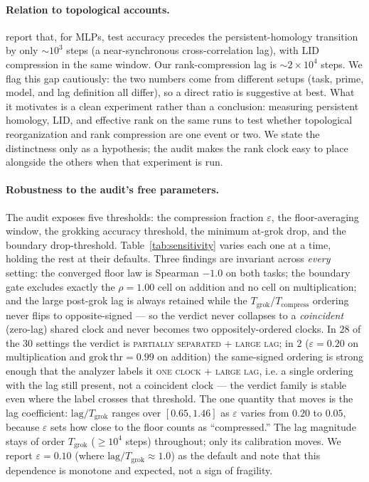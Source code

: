 \documentclass[11pt]{article}
\begin{document}
\paragraph{Relation to topological accounts.} \citet{tang2026topological} report that, for MLPs,
test accuracy precedes the persistent-homology transition by only $\sim\!10^3$ steps (a near-synchronous
cross-correlation lag), with LID compression in the same window. Our rank-compression lag is
$\sim\!2\times10^4$ steps. We flag this gap cautiously: the two numbers come from different setups
(task, prime, model, and lag definition all differ), so a direct ratio is suggestive at best. What it
motivates is a clean experiment rather than a conclusion: measuring persistent homology, LID, and effective
rank on the same runs to test whether topological reorganization and rank compression are one
event or two. We state the distinctness only as a hypothesis; the audit makes the rank clock easy to
place alongside the others when that experiment is run.


\paragraph{Robustness to the audit's free parameters.} The audit exposes five thresholds: the
compression fraction $\varepsilon$, the floor-averaging window, the grokking accuracy threshold, the
minimum at-grok drop, and the boundary drop-threshold. Table~\ref{tab:sensitivity} varies each one at a
time, holding the rest at their defaults. Three findings are invariant across \emph{every} setting: the
converged floor law is Spearman $-1.0$ on both tasks; the boundary gate excludes exactly the $\rho=1.00$
cell on addition and no cell on multiplication; and the large post-grok lag is always retained while the
$T_{\mathrm{grok}}$/$T_{\mathrm{compress}}$ ordering never flips to opposite-signed --- so the verdict
never collapses to a \emph{coincident} (zero-lag) shared clock and never becomes two oppositely-ordered
clocks. In $28$ of the $30$ settings the verdict is \textsc{partially separated + large lag}; in $2$
($\varepsilon=0.20$ on multiplication and $\mathrm{grok\,thr}=0.99$ on addition) the same-signed ordering
is strong enough that the analyzer labels it \textsc{one clock + large lag}, i.e. a single ordering with
the lag still present, not a coincident clock --- the verdict family is stable even where the label
crosses that threshold. The one
quantity that moves is the lag coefficient: $\mathrm{lag}/T_{\mathrm{grok}}$ ranges over $[0.65,1.46]$ as
$\varepsilon$ varies from $0.20$ to $0.05$, because $\varepsilon$ sets how close to the floor counts as
``compressed.'' The lag magnitude stays of order $T_{\mathrm{grok}}$ ($\geq\!10^4$
steps) throughout; only its calibration moves. We report $\varepsilon=0.10$ (where
$\mathrm{lag}/T_{\mathrm{grok}}\approx1.0$) as the default and note that this dependence is monotone and
expected, not a sign of fragility.
\end{document}
